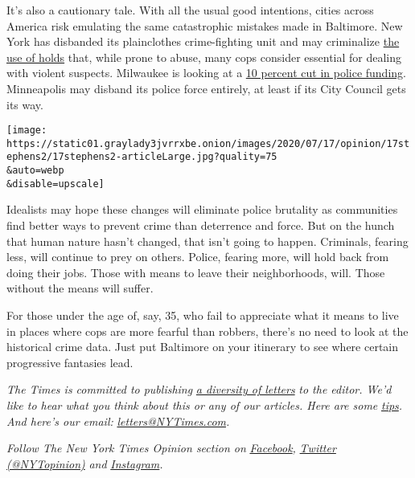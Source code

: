 It's also a cautionary tale. With all the usual good intentions, cities
across America risk emulating the same catastrophic mistakes made in
Baltimore. New York has disbanded its plainclothes crime-fighting unit
and may criminalize
\href{https://www.nydailynews.com/news/politics/ny-new-york-state-police-union-pull-out-of-city-reforms-20200715-uwcgecxovbfpxo3kxjej3otrby-story.html}{the
use of holds} that, while prone to abuse, many cops consider essential
for dealing with violent suspects. Milwaukee is looking at a
\href{https://www.jsonline.com/story/news/solutions/2020/07/14/mpd-chief-details-cuts-might-required-defund-police/5421894002/}{10
percent cut in police funding}. Minneapolis may disband its police force
entirely, at least if its City Council gets its way.

\texttt{[image: https://static01.graylady3jvrrxbe.onion/images/2020/07/17/opinion/17stephens2/17stephens2-articleLarge.jpg?quality=75\\\&auto=webp\\\&disable=upscale]}

Idealists may hope these changes will eliminate police brutality as
communities find better ways to prevent crime than deterrence and force.
But on the hunch that human nature hasn't changed, that isn't going to
happen. Criminals, fearing less, will continue to prey on others.
Police, fearing more, will hold back from doing their jobs. Those with
means to leave their neighborhoods, will. Those without the means will
suffer.

For those under the age of, say, 35, who fail to appreciate what it
means to live in places where cops are more fearful than robbers,
there's no need to look at the historical crime data. Just put Baltimore
on your itinerary to see where certain progressive fantasies lead.

\emph{The Times is committed to publishing}
\href{https://www.nytimes3xbfgragh.onion/2019/01/31/opinion/letters/letters-to-editor-new-york-times-women.html}{\emph{a
diversity of letters}} \emph{to the editor. We'd like to hear what you
think about this or any of our articles. Here are some}
\href{https://help.nytimes3xbfgragh.onion/hc/en-us/articles/115014925288-How-to-submit-a-letter-to-the-editor}{\emph{tips}}\emph{.
And here's our email:}
\href{mailto:letters@NYTimes.com}{\emph{letters@NYTimes.com}}\emph{.}

\emph{Follow The New York Times Opinion section on}
\href{https://www.facebookcorewwwi.onion/nytopinion}{\emph{Facebook}}\emph{,}
\href{http://twitter.com/NYTOpinion}{\emph{Twitter (@NYTopinion)}}
\emph{and}
\href{https://www.instagram.com/nytopinion/}{\emph{Instagram}}\emph{.}

